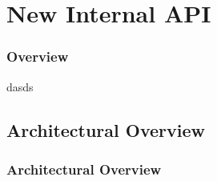 
\section{New Internal API}
\begin{frame}\frametitle{Overview}
  dasds
\end{frame}

\subsection{Architectural Overview}
\begin{frame}\frametitle{Architectural Overview}
\end{frame}
